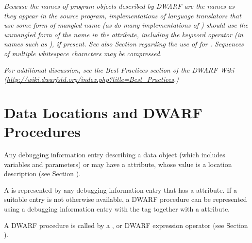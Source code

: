 \textit{Because the names of program objects described by DWARF are
the names as they appear in the source program, implementations
of language translators that use some form of mangled name
(as do many implementations of ) should use the
unmangled form of the name in the
\DWATname{} attribute,
including the keyword operator (in names such as ),
if present. See also
Section  regarding the use of
\DWATlinkagename{} for
.
Sequences of multiple whitespace characters may be compressed.}

\textit{For additional discussion, see the Best Practices section
of the DWARF Wiki
(\url{http://wiki.dwarfstd.org/index.php?title=Best_Practices}.)}

\section{Data Locations and DWARF Procedures}
\label{chap:datalocationsanddwarfprocedures}
\hypertarget{chap:DWATlocationdataobjectlocation}{}
Any debugging information entry describing a data object (which
includes variables and parameters) or
may have a \DWATlocationDEFN{} attribute,
whose value is a location description
(see Section ).

A  is represented by any
debugging information entry that has a
\DWATlocationNAME{} attribute.
If a suitable entry is not otherwise available,
a DWARF procedure can be represented using a debugging
information entry 
with the tag \DWTAGdwarfprocedureTARG{} together with a
\DWATlocationNAME{} attribute.

A DWARF procedure is called by a \DWOPcalltwo, \DWOPcallfour{}
or \DWOPcallref{} DWARF expression operator
(see Section ).

